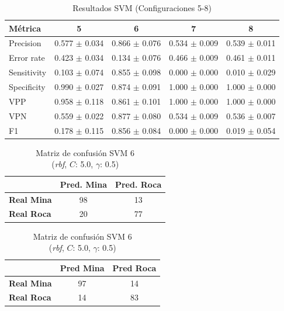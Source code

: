\documentclass[a4paper,10pt]{article}
\begin{document}
    \begin{table}[h!]
    \centering
    \caption{Resultados SVM (Configuraciones 5-8)}
    \begin{tabular}{lcccc}
    \toprule
    Métrica & 5 & 6 & 7 & 8 \\
    \midrule
    Precision & 0.577 $\pm$ 0.034 & 0.866 $\pm$ 0.076 & 0.534 $\pm$ 0.009 & 0.539 $\pm$ 0.011 \\
    Error rate & 0.423 $\pm$ 0.034 & 0.134 $\pm$ 0.076 & 0.466 $\pm$ 0.009 & 0.461 $\pm$ 0.011 \\
    Sensitivity & 0.103 $\pm$ 0.074 & 0.855 $\pm$ 0.098 & 0.000 $\pm$ 0.000 & 0.010 $\pm$ 0.029 \\
    Specificity & 0.990 $\pm$ 0.027 & 0.874 $\pm$ 0.091 & 1.000 $\pm$ 0.000 & 1.000 $\pm$ 0.000 \\
    VPP & 0.958 $\pm$ 0.118 & 0.861 $\pm$ 0.101 & 1.000 $\pm$ 0.000 & 1.000 $\pm$ 0.000 \\
    VPN & 0.559 $\pm$ 0.022 & 0.877 $\pm$ 0.080 & 0.534 $\pm$ 0.009 & 0.536 $\pm$ 0.007 \\
    F1 & 0.178 $\pm$ 0.115 & 0.856 $\pm$ 0.084 & 0.000 $\pm$ 0.000 & 0.019 $\pm$ 0.054 \\
    \bottomrule
    \end{tabular}
    \label{tab:svm5_8}
    \end{table}
    \begin{table}[h!]
        \centering
        \begin{minipage}{0.45\textwidth}
            \centering
            \caption{\centering Matriz de confusión SVM 3 \\ 
                    (\textit{poly}, $C$: 10.0, $\gamma$: 0.1, degree: 3, coef1: 1.0)}
            \begin{tabular}{lcc}
                \toprule
                & \textbf{Pred. Mina} & \textbf{Pred. Roca} \\
                \midrule
                \textbf{Real Mina} & 98 & 13 \\
                \textbf{Real Roca} & 20 & 77 \\
                \bottomrule
            \end{tabular}
        \end{minipage}%
        \hspace{0.05\textwidth}
        \begin{minipage}{0.45\textwidth}
            \centering
            \caption{\centering Matriz de confusión SVM 6 \\ 
                    (\textit{rbf}, $C$: 5.0, $\gamma$: 0.5)}
            \begin{tabular}{lcc}
                \toprule
                & \textbf{Pred Mina} & \textbf{Pred Roca} \\
                \midrule
                \textbf{Real Mina} & 97 & 14 \\
                \textbf{Real Roca} & 14 & 83 \\
                \bottomrule
            \end{tabular}
        \end{minipage}
    \end{table}
\end{document}
